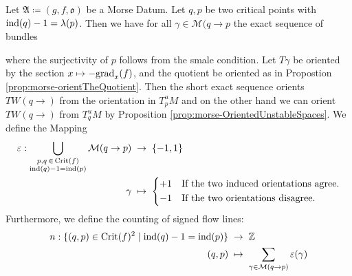 \begin{definition}\label{def:morse-signedFlowLines}
	Let $\mathfrak{A}\coloneq (g,f,\mathfrak{o})$ be a Morse Datum. Let $q,p$ be two critical points with $\mathrm{ind}(q)-1=\lambda(p)$. Then we have for all $\gamma\in \mathcal{M}(q\to p$ the exact sequence of bundles
	\begin{center}
	\end{center} where the surjectivity of $p$ follows from the smale condition. Let $T\gamma$ be oriented by the section $x\mapsto -\mathrm{grad}_x(f)$, and the quotient be oriented as in Propostion \ref{prop:morse-orientTheQuotient}. Then the short exact sequence orients $TW(q\to)$ from the orientation in $T^u_pM$ and on the other hand we can orient $TW(q\to)$ from $T^u_qM$ by Proposition \ref{prop:morse-OrientedUnstableSpaces}.  
	We define the Mapping
\begin{align*}
 \varepsilon:  \bigcup_{\substack{p,q\,\in\,\Crit(f)\\ \ind(q)-1=\ind(p)}}
    \mathcal{M}(q\to p)&\;\to\;\{-1,1\}\\
\gamma &\;\mapsto \;  \begin{cases*}
	+1& If the two induced orientations agree.\\
	-1& If the two orientations disagree.
\end{cases*}
\end{align*}
Furthermore, we define the counting of signed flow lines: 
\begin{align*}
	n: \{(q,p)\in \mathrm{Crit}(f)^2 \mid \mathrm{ind}(q)-1=\mathrm{ind}(p)\}&\;\to\; \mathbb{Z}\\
	(q,p)&\;\mapsto \; \sum_{\gamma\in \mathcal{M}(q\to p)} \varepsilon(\gamma)
\end{align*}
\end{definition}


